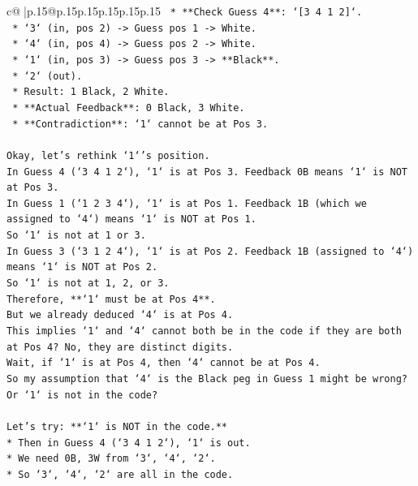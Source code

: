 \documentclass{article}
\begin{document}
{\begin{supertabular}{c@{$\;$}|p{.15\linewidth}@{}p{.15\linewidth}p{.15\linewidth}p{.15\linewidth}p{.15\linewidth}p{.15\linewidth}}
{{{\texttt{    *   **Check Guess 4**: `{[}3 4 1 2{]}`.} \\
\texttt{        *   `3` (in, pos 2) {-}> Guess pos 1 {-}> White.} \\
\texttt{        *   `4` (in, pos 4) {-}> Guess pos 2 {-}> White.} \\
\texttt{        *   `1` (in, pos 3) {-}> Guess pos 3 {-}> **Black**.} \\
\texttt{        *   `2` (out).} \\
\texttt{        *   Result: 1 Black, 2 White.} \\
\texttt{        *   **Actual Feedback**: 0 Black, 3 White.} \\
\texttt{        *   **Contradiction**: `1` cannot be at Pos 3.} \\
\\ 
\texttt{Okay, let's rethink `1`'s position.} \\
\texttt{In Guess 4 (`3 4 1 2`), `1` is at Pos 3. Feedback 0B means `1` is NOT at Pos 3.} \\
\texttt{In Guess 1 (`1 2 3 4`), `1` is at Pos 1. Feedback 1B (which we assigned to `4`) means `1` is NOT at Pos 1.} \\
\texttt{So `1` is not at 1 or 3.} \\
\texttt{In Guess 3 (`3 1 2 4`), `1` is at Pos 2. Feedback 1B (assigned to `4`) means `1` is NOT at Pos 2.} \\
\texttt{So `1` is not at 1, 2, or 3.} \\
\texttt{Therefore, **`1` must be at Pos 4**.} \\
\texttt{But we already deduced `4` is at Pos 4.} \\
\texttt{This implies `1` and `4` cannot both be in the code if they are both at Pos 4? No, they are distinct digits.} \\
\texttt{Wait, if `1` is at Pos 4, then `4` cannot be at Pos 4.} \\
\texttt{So my assumption that `4` is the Black peg in Guess 1 might be wrong?} \\
\texttt{Or `1` is not in the code?} \\
\\ 
\texttt{Let's try: **`1` is NOT in the code.**} \\
\texttt{*   Then in Guess 4 (`3 4 1 2`), `1` is out.} \\
\texttt{*   We need 0B, 3W from `3`, `4`, `2`.} \\
\texttt{*   So `3`, `4`, `2` are all in the code.} \\
}}}
\end{supertabular}}
\end{document}
